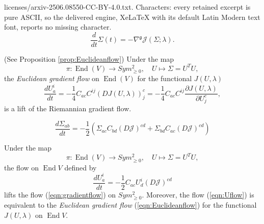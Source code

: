\documentclass[10pt,a4paper]{amsart}
\DeclareMathOperator{\End}{End}
\begin{document}
licenses/arxiv-2506.08550-CC-BY-4.0.txt. Characters: every retained excerpt is pure ASCII, so the delivered engine, XeLaTeX with its default Latin Modern text font, reports no missing character.
	\begin{equation}\label{eqn:gradientflow}
		\frac{d}{dt} \Sigma(t)= - \nabla^{\mathfrak{g}} \mathcal{J}(\Sigma;\lambda).
	\end{equation}

	\begin{thm}
		(See Proposition \ref{prop:Euclideanflow})  Under the map 
		\[
		\pi: \End(V)\to Sym^2_{\geq 0}, \quad U\mapsto \Sigma=U^T U,
		\]
		the \emph{Euclidean gradient flow} on $\End(V)$ for the functional $J(U,\lambda)$
		\begin{equation}\label{eqn:Euclideanflow}
			\frac{dU_a^i}{dt}= - \frac{1}{4} C_{ac} C^{ij} (DJ(U,\lambda))_j^c  =  - \frac{1}{4} C_{ac} C^{ij}  \frac{\partial J(U,\lambda)}{\partial U_j^c}  ,
		\end{equation}
		is a lift of the Riemannian gradient flow.
	\end{thm}

	\begin{equation}\label{eqn:gradientflow2}
		\frac{d\Sigma_{ab}}{dt}= - \frac{1}{2} (\Sigma_{ac} C_{bd} (D \mathcal{J})^{cd}   +  \Sigma_{bd} C_{ac}  (D \mathcal{J})^{cd}    )
	\end{equation}

	\begin{prop}\label{prop:Euclideanflow}
		Under the map
		\[
		\pi: \End(V) \to Sym^2_{\geq 0}, \quad U\mapsto \Sigma= U^T U,
		\]
		the flow on $\End{V}$ defined by  
		\begin{equation}\label{eqn:Uflow}
			\frac{dU_a^i}{dt}= - \frac{1}{2} C_{ac} U_d^i (D\mathcal{J})^{cd}
		\end{equation}
		lifts the flow (\ref{eqn:gradientflow}) on $Sym^2_{\geq 0}$. Moreover, the flow (\ref{eqn:Uflow}) is equivalent to the \emph{Euclidean gradient flow} (\ref{eqn:Euclideanflow}) for the functional $J(U,\lambda)$ on $\End{V}$.
	\end{prop}
\end{document}

